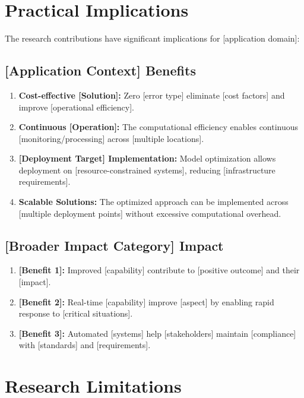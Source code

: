 \section{Practical Implications}

The research contributions have significant implications for [application domain]:

\subsection{[Application Context] Benefits}

\begin{enumerate}
\item \textbf{Cost-effective [Solution]:} Zero [error type] eliminate [cost factors] and improve [operational efficiency].

\item \textbf{Continuous [Operation]:} The computational efficiency enables continuous [monitoring/processing] across [multiple locations].

\item \textbf{[Deployment Target] Implementation:} Model optimization allows deployment on [resource-constrained systems], reducing [infrastructure requirements].

\item \textbf{Scalable Solutions:} The optimized approach can be implemented across [multiple deployment points] without excessive computational overhead.
\end{enumerate}

\subsection{[Broader Impact Category] Impact}

\begin{enumerate}
\item \textbf{[Benefit 1]:} Improved [capability] contribute to [positive outcome] and their [impact].

\item \textbf{[Benefit 2]:} Real-time [capability] improve [aspect] by enabling rapid response to [critical situations].

\item \textbf{[Benefit 3]:} Automated [systems] help [stakeholders] maintain [compliance] with [standards] and [requirements].
\end{enumerate}

\section{Research Limitations}

